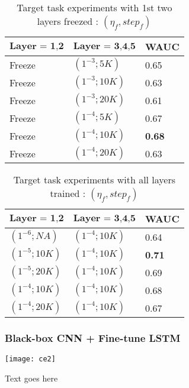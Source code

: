 \begin{table}[H]
\label{tab:a7}
\centering
\begin{tabular}{| p{} | p{}| p{}| }
\hline
$\textbf{Layer = 1,2}$ & $\textbf{Layer = 3,4,5}$ & \textbf{WAUC}\\
\hline
Freeze & $(1^{-3}; 5K)$ & 0.65\\
\hline
Freeze & $(1^{-3}; 10K)$ & 0.63\\
\hline
Freeze & $(1^{-3}; 20K)$ & 0.61\\
\hline
Freeze & $(1^{-4}; 5K)$ & 0.67\\
\hline
Freeze & $(1^{-4}; 10K)$ & \textbf{0.68}\\
\hline
Freeze & $(1^{-4}; 20K)$ & 0.63\\
\hline
\end{tabular}
\caption{Target task experiments with 1st two layers freezed : $(\eta_{f}, {step}_{f})$} 
\end{table}

\begin{table}[H]
\label{tab:a8}
\centering
\begin{tabular}{| p{} | p{}| p{}| }
\hline
$\textbf{Layer = 1,2}$ & $\textbf{Layer = 3,4,5}$ & \textbf{WAUC}\\
\hline
$(1^{-6}; NA)$ & $(1^{-4}; 10K)$ & 0.64\\
\hline
$(1^{-5}; 10K)$ & $(1^{-4}; 10K)$ & \textbf{0.71}\\
\hline
$(1^{-5}; 20K)$ & $(1^{-4}; 10K)$ & 0.69\\
\hline
$(1^{-4}; 10K)$ & $(1^{-4}; 10K)$ & 0.68\\
\hline
$(1^{-4}; 20K)$ & $(1^{-4}; 10K)$ & 0.67\\
\hline
\end{tabular}
\caption{Target task experiments with all layers trained : $(\eta_{f}, {step}_{f})$}
\end{table}

\subsubsection{Black-box CNN + Fine-tune LSTM}
\begin{minipage}{0.15\textwidth}
\texttt{[image: ce2]}
\end{minipage}
\begin{minipage}{0.80\textwidth}
Text goes here
\end{minipage}

